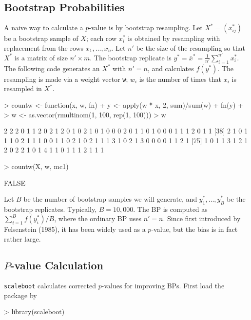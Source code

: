 \documentclass[a4paper]{amsart}
\begin{document}
\subsection{Bootstrap Probabilities}

A naive way to calculate a $p$-value is by bootstrap resampling.  Let
$X^*=(x^*_{ij})$ be a bootstrap sample of $X$; each row $x^*_i$ is
obtained by resampling with replacement from the rows
$x_1,\ldots,x_n$.  Let $n'$ be the size of the resampling so that
$X^*$ is a matrix of size $n'\times m$. The bootstrap replicate is
$y^* = \bar x^* = \tfrac{1}{n'} \sum_{i=1}^{n'} x_i^*$. The following
code generates an $X^*$ with $n'=n$, and calculates $f(y^*)$. The
resampling is made via a weight vector {\tt w}; $w_i$ is the number of
times that $x_i$ is resampled in $X^*$.
\begin{Schunk}
\begin{Sinput}
> countw <- function(x, w, fn) {
+     y <- apply(w * x, 2, sum)/sum(w)
+     fn(y)
+ }
> w <- as.vector(rmultinom(1, 100, rep(1, 100)))
> w
\end{Sinput}
\begin{Soutput}
  [1] 2 2 2 0 1 1 2 0 2 1 2 0 1 0 2 1 0 1 0 0 0 2 0 1 1 0 1 0 0 0 1 1 1 2 0 1 1
 [38] 2 1 0 1 1 1 0 2 1 1 1 0 0 1 1 0 2 1 0 2 1 1 1 3 1 0 2 1 3 0 0 0 0 1 1 2 1
 [75] 1 0 1 1 3 1 2 1 2 0 2 2 1 0 1 4 1 1 0 1 1 1 2 1 1 1
\end{Soutput}
\begin{Sinput}
> countw(X, w, mc1)
\end{Sinput}
\begin{Soutput}
[1] FALSE
\end{Soutput}
\end{Schunk}

Let $B$ be the number of bootstrap samples we will generate, and
$y^*_1,\ldots, y^*_B$ be the bootstrap replicates. Typically,
$B=10,000$. The BP is computed as $\sum_{i=1}^B f(y^*_i)/B$, where the
ordinary BP uses $n'=n$.  Since first introduced by Felsenstein
(1985), it has been widely used as a $p$-value, but the bias is in
fact rather large.


\subsection{$P$-value Calculation}

{\tt scaleboot} calculates corrected $p$-values for improving BPs.
First load the package by
\begin{Schunk}
\begin{Sinput}
> library(scaleboot)
\end{Sinput}
\end{Schunk}
\end{document}
